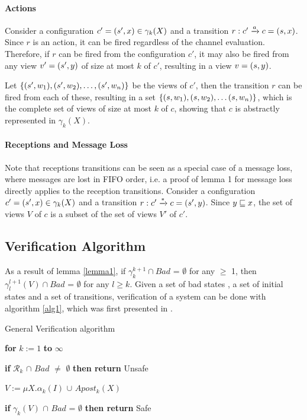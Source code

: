 \paragraph{Actions}
Consider a configuration $c' = (s', x) \in \gamma_k(X)$ and a transition $r: c' \xrightarrow{a} c = (s, x)$. Since $r$ is an action, it can be fired regardless of the channel evaluation. Therefore, if $r$ can be fired from the configuration $c'$, it may also be fired from any view $v' = (s', y)$ of size at most $k$ of $c'$, resulting in a view $v =  (s, y)$.

Let $\{(s', w_1), (s', w_2), \ldots,  (s', w_n)\}$ be the views of $c'$, then the transition $r$ can be fired from each of these, resulting in a set $\{(s, w_1), (s, w_2),\ldots (s, w_n)\}$, which is the complete set of views of size at most $k$ of $c$, showing that $c$ is abstractly represented in $\gamma_k(X)$.

\paragraph{Receptions and Message Loss}
Note that receptions transitions can be seen as a special case of a message loss, where messages are lost in FIFO order, i.e. a proof of lemma 1 for message loss directly applies to the reception transitions. Consider a configuration $c' = (s', x) \in \gamma_k(X)$ and a transition $r: c' \xrightarrow{*} c = (s', y)$. Since $y \sqsubseteq x$, the set of views $V$ of $c$ is a subset of the set of views $V'$ of $c'$.

\subsection{Verification Algorithm}
\label{verificationalgorithm}
As a result of lemma \ref{lemma1}, if $\gamma_k^{k+1} \cap Bad$ = $\emptyset$ for any  $\geq$ 1, then $\gamma_l^{l+1}(V) \cap Bad$ = $\emptyset$ for any $l \geq k$.  Given a set of bad states , a set of initial states  and a set of transitions, verification of a system can be done with algorithm \ref{alg1}, which was first presented in \cite{parosh}.

\begin{algorithm}
  \caption{General Verification algorithm}
  \label{alg1}
    \hspace{8pt}\textbf{for} $k := 1$ \textbf{to} $\infty$

    \hspace{16pt}\textbf{if} $\mathcal{R}_k$ $\cap$ $Bad$ $\neq$ $\emptyset$ \textbf{then return} Unsafe

    \hspace{16pt}$V := \mu X.\alpha_k(I)$ $\cup$ $Apost_k(X)$

    \hspace{16pt}\textbf{if} {$\gamma_k(V)$ $\cap$ $Bad$ = $\emptyset$} \textbf{then return} Safe
\end{algorithm}


